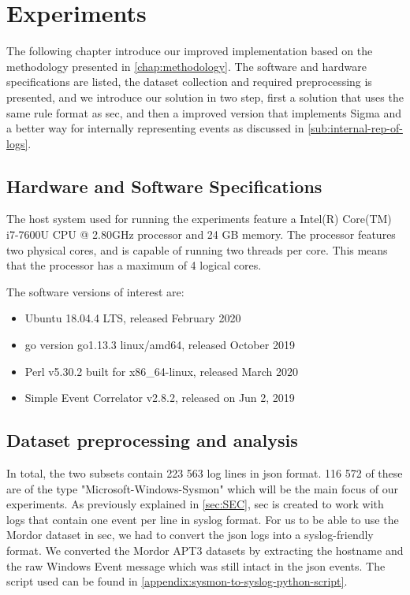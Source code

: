 \chapter{Experiments}
\label{chap:experiments}
The following chapter introduce our improved implementation based on the methodology presented in \cref{chap:methodology}. The software and hardware specifications are listed, the dataset collection and required preprocessing is presented, and we introduce our solution in two step, first a solution that uses the same rule format as \acrshort{sec}, and then a improved version that implements Sigma \cite{Sigma} and a better way for internally representing events as discussed in \cref{sub:internal-rep-of-logs}.


\section{Hardware and Software Specifications}
\label{sec:hardwaresoftwarespecs}
The host system used for running the experiments feature a Intel(R) Core(TM) i7-7600U CPU @ 2.80GHz processor and 24 GB memory. The processor features two physical cores, and is capable of running two threads per core. This means that the processor has a maximum of 4 logical cores.

The software versions of interest are:
\begin{itemize}
    \item Ubuntu 18.04.4 LTS, released February 2020
    \item go version go1.13.3 linux/amd64, released October 2019
    \item Perl v5.30.2 built for x86\_64-linux, released March 2020
    \item Simple Event Correlator v2.8.2, released on Jun 2, 2019
\end{itemize}

\section{Dataset preprocessing and analysis}
\label{sec:dataset-experiments}

In total, the two subsets contain 223 563 log lines in \acrshort{json} format. 116 572 of these are of the type "Microsoft-Windows-Sysmon" which will be the main focus of our experiments.
As previously explained in \cref{sec:SEC}, \acrshort{sec} is created to work with logs that contain one event per line in syslog format. For us to be able to use the Mordor dataset in \acrshort{sec}, we had to convert the \acrshort{json} logs into a syslog-friendly format. We converted the Mordor APT3 datasets by extracting the hostname and the raw Windows Event message which was still intact in the \acrshort{json} events. The script used can be found in \cref{appendix:sysmon-to-syslog-python-script}. 


